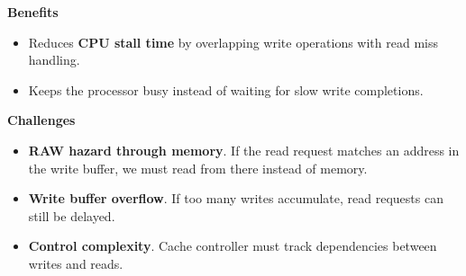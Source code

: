 \highspace
\begin{flushleft}
    \textcolor{Green3}{ \textbf{Benefits}}
\end{flushleft}
\begin{itemize}
    \item[\textcolor{Green3}{\faIcon{check}}] Reduces \textbf{CPU stall time} by overlapping write operations with read miss handling.
    \item[\textcolor{Green3}{\faIcon{check}}] Keeps the processor busy instead of waiting for slow write completions.
\end{itemize}

\highspace
\begin{flushleft}
    \textcolor{Red2}{ \textbf{Challenges}}
\end{flushleft}
\begin{itemize}
    \item[\textcolor{Red2}{\faIcon{times}}] \textcolor{Red2}{\textbf{RAW hazard through memory}}. If the read request matches an address in the write buffer, we must read from there instead of memory.
    \item[\textcolor{Red2}{\faIcon{times}}] \textcolor{Red2}{\textbf{Write buffer overflow}}. If too many writes accumulate, read requests can still be delayed.
    \item[\textcolor{Red2}{\faIcon{times}}] \textcolor{Red2}{\textbf{Control complexity}}. Cache controller must track dependencies between writes and reads.
\end{itemize}
